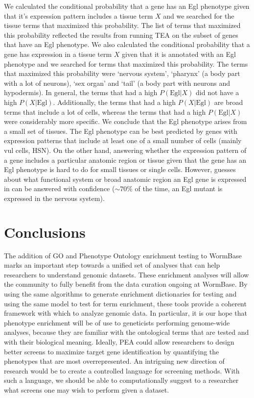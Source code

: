 \documentclass[10pt,letterpaper,twocolumn]{article}
\begin{document}
We calculated the conditional probability that a gene has an Egl phenotype given
that it's expression pattern includes a tissue term $X$ and we searched for the
tissue terms that maximized this probability. The list of terms that maximized this
probability reflected the results from running TEA on the subset of genes that have
an Egl phenotype. We also calculated the conditional probability that a gene has
expression in a tissue term $X$ given that it is annotated with an Egl phenotype
and we searched for terms that maximized this probability. The terms that maximized
this probability were `nervous system', `pharynx' (a body part with a lot of neurons),
`sex organ' and `tail' (a body part with neurons and hypodermis). In general, the
terms that had a high $P(\text{Egl}|X)$ did not have a high $P(X|\text{Egl})$.
Additionally, the terms that had a high $P(X|\text{Egl})$ are broad terms that
include a lot of cells, whereas the terms that had a high $P(\text{Egl}|X)$
were considerably more specific.
We conclude that the Egl phenotype arises from a small set of tissues. The Egl
phenotype can be best predicted by genes with expression patterns that include
at least one of a small number of cells (mainly vul cells, HSN). On the other
hand, answering whether the expression pattern of a gene includes a particular
anatomic region or tissue given that the gene has an Egl phenotype is hard to
do for small tissues or single cells. However, guesses about what functional system
or broad anatomic region an Egl gene is expressed in can be answered with
confidence ($\sim70\%$ of the time, an Egl mutant is expressed in
the nervous system).

\section*{Conclusions}
The addition of GO and Phenotype Ontology enrichment testing to WormBase marks
an important step towards a unified set of analyses that can help researchers
to understand genomic datasets. These enrichment analyses will allow the community to
fully benefit from the data curation ongoing at WormBase. By using the same
algorithms to generate enrichment dictionaries for testing and using the
same model to test for term enrichment, these tools provide a coherent framework
with which to analyze genomic data. In particular, it is our hope that
phenotype enrichment will be of use to geneticists performing genome-wide
analyses, because they are familiar with the ontological terms that are tested
and with their biological meaning. Ideally, PEA could allow researchers to
design better screens to maximize target gene identification by quantifying
the phenotypes that are most overrepresented. An intriguing new direction of
research would be to create a controlled language for screening methods. With
such a language, we should be able to computationally suggest to a researcher
what screens one may wish to perform given a dataset.





\end{document}
